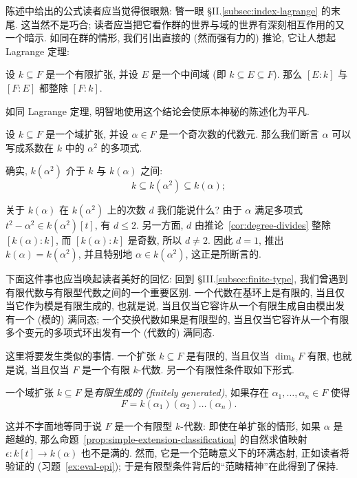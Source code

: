 陈述中给出的公式读者应当觉得很眼熟: 瞥一眼 §II.\ref{subsec:index-lagrange} 的末尾. 这当然不是巧合; 读者应当把它看作群的世界与域的世界有深刻相互作用的又一个暗示. 如同在群的情形, 我们引出直接的 (然而强有力的) 推论, 它让人想起 Lagrange 定理:

\begin{corollary}\label{cor:degree-divides}
设 $k\subseteq F$ 是一个有限扩张, 并设 $E$ 是一个中间域 (即 $k\subseteq E\subseteq F$). 那么 $[E:k]$ 与 $[F:E]$ 都整除 $[F:k]$.
\end{corollary}

如同 Lagrange 定理, 明智地使用这个结论会使原本神秘的陈述化为平凡.

\begin{example}\label{ex:alpha-odd-poly}
设 $k\subseteq F$ 是一个域扩张, 并设 $\alpha\in F$ 是一个奇次数的代数元. 那么我们断言 $\alpha$ 可以写成系数在 $k$ 中的 $\alpha^2$ 的多项式.

确实, $k(\alpha^2)$ 介于 $k$ 与 $k(\alpha)$ 之间:
\[
k\subseteq k(\alpha^2)\subseteq k(\alpha);
\]

关于 $k(\alpha)$ 在 $k(\alpha^2)$ 上的次数 $d$ 我们能说什么? 由于 $\alpha$ 满足多项式 $t^2-\alpha^2\in k(\alpha^2)[t]$, 有 $d\leq 2$. 另一方面, $d$ 由推论~\ref{cor:degree-divides} 整除 $[k(\alpha):k]$, 而 $[k(\alpha):k]$ 是奇数, 所以 $d\neq 2$. 因此 $d=1$, 推出 $k(\alpha)=k(\alpha^2)$, 并且特别地 $\alpha\in k(\alpha^2)$, 这正是所断言的.
\end{example}

下面这件事也应当唤起读者美好的回忆: 回到 §III.\ref{subsec:finite-type}, 我们曾遇到有限代数与有限型代数之间的一个重要区别. 一个代数在基环上是有限的, 当且仅当它作为模是有限生成的, 也就是说, 当且仅当它容许从一个有限生成自由模出发有一个 (模的) 满同态; 一个交换代数如果是有限型的, 当且仅当它容许从一个有限多个变元的多项式环出发有一个 (代数的) 满同态.

这里将要发生类似的事情. 一个扩张 $k\subseteq F$ 是有限的, 当且仅当 $\dim_k F$ 有限, 也就是说, 当且仅当 $F$ 是一个有限 $k$-代数. 另一个有限性条件取如下形式.

\begin{definition}\label{def:fg-extension}
一个域扩张 $k\subseteq F$ 是\emph{有限生成的 (finitely generated)}, 如果存在 $\alpha_1,\ldots,\alpha_n\in F$ 使得
\[
F=k(\alpha_1)(\alpha_2)\dots(\alpha_n).
\]
\end{definition}

\begin{remark}\label{rmk:fg-not-finite-type}
这并不字面地等同于说 $F$ 是一个有限型 $k$-代数: 即使在单扩张的情形, 如果 $\alpha$ 是超越的, 那么命题~\ref{prop:simple-extension-classification} 的自然求值映射 $\epsilon:k[t]\to k(\alpha)$ 也不是满的. 然而, 它是一个范畴意义下的环满态射, 正如读者将验证的 (习题~\ref{ex:eval-epi}); 于是有限型条件背后的``范畴精神''在此得到了保持.
\end{remark}

